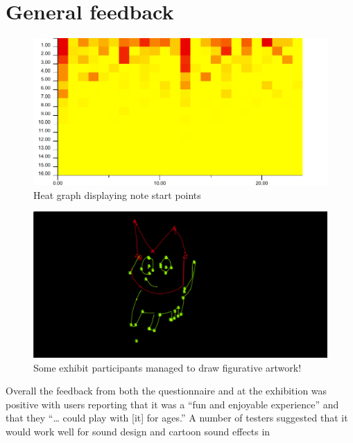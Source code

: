 \documentclass[12pt]{report}
\begin{document}
\section{General feedback}
\label{sec:orga3b7034}
\begin{LATEX}
\begin{figure}[h]
\centering
\includegraphics[width=1.0\textwidth]{./assets/hm-yellow-red.pdf}
\caption{Heat graph displaying note start points}
\label{fig:note-onset-hm}
\end{figure}
\label{org996ba97}
\end{LATEX}
\begin{LATEX}
\begin{figure}[h]
\centering
\includegraphics[width=1.0\textwidth]{./assets/exhibit-cat.png}
\caption{Some exhibit participants managed to draw figurative artwork!}
\label{fig:exhibit-cat}
\end{figure}
\label{orgb8b1014}
\end{LATEX}
Overall the feedback from both the questionnaire and at the exhibition was
positive with users reporting that it was a ``fun and enjoyable experience'' and
that they ``\ldots{} could play with [it] for ages.'' A number of testers suggested
that it would work well for sound design and cartoon sound effects in
\end{document}
